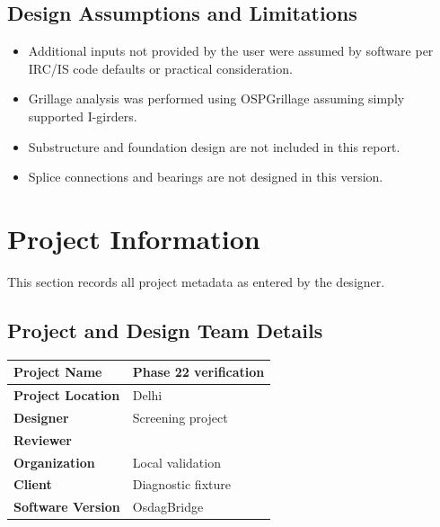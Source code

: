 \documentclass[12pt,a4paper]{report}
\numberwithin{table}{chapter}
\numberwithin{figure}{chapter}
\begin{document}
\section*{Design Assumptions and Limitations}
\label{sec:assumptions}

\begin{itemize}
\item Additional inputs not provided by the user were assumed by software per IRC/IS code defaults or practical consideration.
\item Grillage analysis was performed using OSPGrillage assuming simply supported I-girders.
\item Substructure and foundation design are not included in this report.
\item Splice connections and bearings are not designed in this version.
\end{itemize}

\titleformat{\chapter}[block]{\normalfont\Large\bfseries\centering}{\thechapter}{1em}{}
\titlespacing*{\chapter}{0pt}{-30pt}{10pt}


\chapter{Project Information}

This section records all project metadata as entered by the designer.

\section{Project and Design Team Details}
\label{sec:project-details}

\begin{tabular}{|L{5.5cm}|L{8.5cm}|}
\hline
\textbf{Project Name} & Phase 22 verification \\
\hline
\textbf{Project Location} & Delhi \\
\hline
\textbf{Designer} & Screening project \\
\hline
\textbf{Reviewer} &  \\
\hline
\textbf{Organization} & Local validation \\
\hline
\textbf{Client} & Diagnostic fixture \\
\hline
\textbf{Software Version} & OsdagBridge \\
\hline
\end{tabular}
\end{document}
